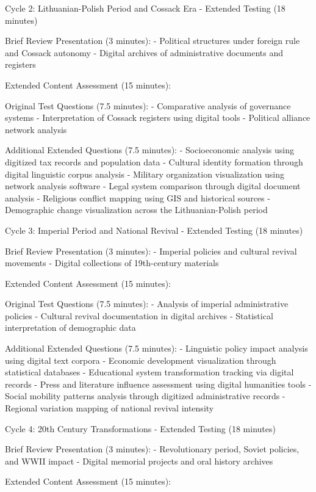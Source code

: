      Cycle 2: Lithuanian-Polish Period and Cossack Era - Extended Testing (18 minutes) 

 Brief Review Presentation (3 minutes): 
- Political structures under foreign rule and Cossack autonomy
- Digital archives of administrative documents and registers

 Extended Content Assessment (15 minutes): 

 Original Test Questions (7.5 minutes): 
- Comparative analysis of governance systems
- Interpretation of Cossack registers using digital tools
- Political alliance network analysis

 Additional Extended Questions (7.5 minutes): 
- Socioeconomic analysis using digitized tax records and population data
- Cultural identity formation through digital linguistic corpus analysis
- Military organization visualization using network analysis software
- Legal system comparison through digital document analysis
- Religious conflict mapping using GIS and historical sources
- Demographic change visualization across the Lithuanian-Polish period

     Cycle 3: Imperial Period and National Revival - Extended Testing (18 minutes) 

 Brief Review Presentation (3 minutes): 
- Imperial policies and cultural revival movements
- Digital collections of 19th-century materials

 Extended Content Assessment (15 minutes): 

 Original Test Questions (7.5 minutes): 
- Analysis of imperial administrative policies
- Cultural revival documentation in digital archives
- Statistical interpretation of demographic data

 Additional Extended Questions (7.5 minutes): 
- Linguistic policy impact analysis using digital text corpora
- Economic development visualization through statistical databases
- Educational system transformation tracking via digital records
- Press and literature influence assessment using digital humanities tools
- Social mobility patterns analysis through digitized administrative records
- Regional variation mapping of national revival intensity

     Cycle 4: 20th Century Transformations - Extended Testing (18 minutes) 

 Brief Review Presentation (3 minutes): 
- Revolutionary period, Soviet policies, and WWII impact
- Digital memorial projects and oral history archives

 Extended Content Assessment (15 minutes): 

